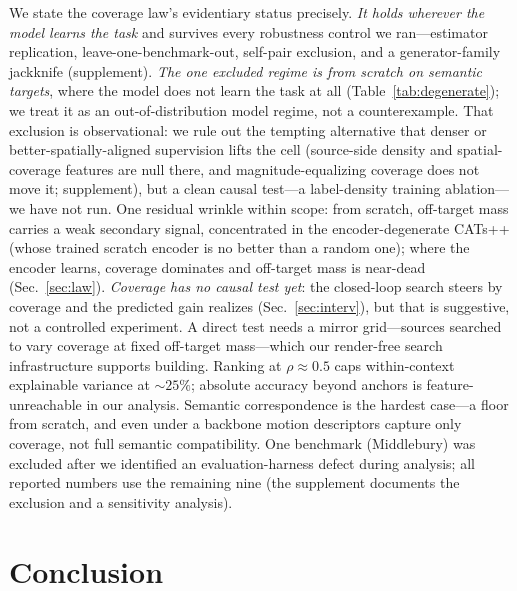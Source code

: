 \documentclass[runningheads]{llncs}
\begin{document}
We state the coverage law's evidentiary status precisely. \emph{It holds
wherever the model learns the task} and survives every robustness control we
ran---estimator replication, leave-one-benchmark-out, self-pair exclusion, and a
generator-family jackknife (supplement). \emph{The one excluded regime is from
scratch on semantic targets}, where the model does not learn the task at all
(Table~\ref{tab:degenerate}); we treat it as an out-of-distribution model regime,
not a counterexample. That exclusion is observational: we rule out the tempting
alternative that denser or better-spatially-aligned supervision lifts the cell
(source-side density and spatial-coverage features are null there, and
magnitude-equalizing coverage does not move it; supplement), but a clean causal
test---a label-density training ablation---we have not run. One residual wrinkle
within scope: from scratch, off-target mass carries a weak secondary signal,
concentrated in the encoder-degenerate CATs++ (whose trained scratch encoder is
no better than a random one); where the encoder learns, coverage dominates and
off-target mass is near-dead (Sec.~\ref{sec:law}). \emph{Coverage has no causal
test yet}: the closed-loop search steers by coverage and the
predicted gain realizes (Sec.~\ref{sec:interv}), but that is suggestive, not a
controlled experiment. A direct test needs a mirror grid---sources searched to
vary coverage at fixed off-target mass---which our render-free search
infrastructure supports building. Ranking at $\rho{\approx}0.5$ caps within-context explainable variance
at ${\sim}25\%$; absolute accuracy beyond anchors is feature-unreachable in our
analysis. Semantic correspondence is the hardest case---a floor from scratch,
and even under a backbone motion descriptors capture only coverage, not full
semantic compatibility. One benchmark (Middlebury) was excluded after we
identified an evaluation-harness defect during analysis; all reported numbers
use the remaining nine (the supplement documents the exclusion and a
sensitivity analysis).

\section{Conclusion}
\label{sec:conclusion}
\end{document}
